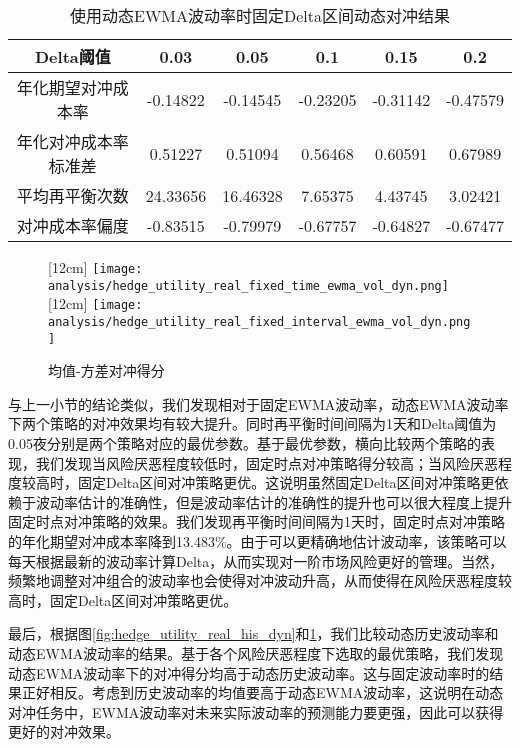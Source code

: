 \begin{table}[htbp]
  \centering
  \caption{使用动态EWMA波动率时固定Delta区间动态对冲结果}
  \label{tab:fixed_interval_5_ewma_vol_dyn}
  \begin{tabular}{cccccc}
    \toprule
    Delta阈值 & 0.03 & 0.05 & 0.1 & 0.15 & 0.2 \\
    \midrule
    年化期望对冲成本率 & -0.14822 & -0.14545 & -0.23205 & -0.31142 & -0.47579 \\
    年化对冲成本率标准差 & 0.51227 & 0.51094 & 0.56468 & 0.60591 & 0.67989 \\
    平均再平衡次数 & 24.33656 & 16.46328 & 7.65375 & 4.43745 & 3.02421 \\
    对冲成本率偏度 & -0.83515 & -0.79979 & -0.67757 & -0.64827 & -0.67477 \\
    \bottomrule
  \end{tabular}
\end{table}

\begin{figure}[htb]
  \centering
  [12cm]
    {\texttt{[image: analysis/hedge\_utility\_real\_fixed\_time\_ewma\_vol\_dyn.png]}}
  \hspace{0.5cm}
  [12cm]
    {\texttt{[image: analysis/hedge\_utility\_real\_fixed\_interval\_ewma\_vol\_dyn.png]}}
    \caption[这里将出现在插图索引中]
    {均值-方差对冲得分}
  \label{fig:hedge_utility_real_ewma_dyn}
\end{figure}

与上一小节的结论类似，我们发现相对于固定EWMA波动率，动态EWMA波动率下两个策略的对冲效果均有较大提升。同时再平衡时间间隔为1天和Delta阈值为0.05夜分别是两个策略对应的最优参数。基于最优参数，横向比较两个策略的表现，我们发现当风险厌恶程度较低时，固定时点对冲策略得分较高；当风险厌恶程度较高时，固定Delta区间对冲策略更优。这说明虽然固定Delta区间对冲策略更依赖于波动率估计的准确性，但是波动率估计的准确性的提升也可以很大程度上提升固定时点对冲策略的效果。我们发现再平衡时间间隔为1天时，固定时点对冲策略的年化期望对冲成本率降到13.483\%。由于可以更精确地估计波动率，该策略可以每天根据最新的波动率计算Delta，从而实现对一阶市场风险更好的管理。当然，频繁地调整对冲组合的波动率也会使得对冲波动升高，从而使得在风险厌恶程度较高时，固定Delta区间对冲策略更优。

最后，根据图\ref{fig:hedge_utility_real_his_dyn}和\ref{fig:hedge_utility_real_ewma_dyn}，我们比较动态历史波动率和动态EWMA波动率的结果。基于各个风险厌恶程度下选取的最优策略，我们发现动态EWMA波动率下的对冲得分均高于动态历史波动率。这与固定波动率时的结果正好相反。考虑到历史波动率的均值要高于动态EWMA波动率，这说明在动态对冲任务中，EWMA波动率对未来实际波动率的预测能力要更强，因此可以获得更好的对冲效果。


